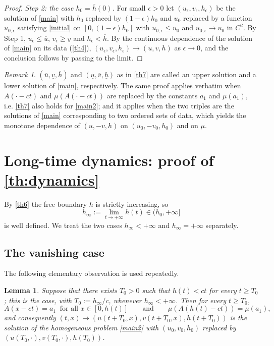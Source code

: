 \documentclass[reqno]{amsart}
\theoremstyle{plain}
\newtheorem{lemma}[theorem]{Lemma}
\theoremstyle{definition}
\theoremstyle{remark}
\newtheorem{remark}{Remark}
\begin{document}
\begin{proof}
	\textit{Step 2: the case $h_0=\overline{h}(0)$.} For small $\epsilon>0$ let
	$(u_\epsilon,v_\epsilon,h_\epsilon)$ be the solution of \eqref{main} with
	$h_0$ replaced by $(1-\epsilon)h_0$ and $u_0$ replaced by a function
	$u_{0,\epsilon}$ satisfying \eqref{initial} on $[0,(1-\epsilon)h_0]$ with
	$u_{0,\epsilon}\le u_0$ and $u_{0,\epsilon}\to u_0$ in $C^2$. By Step 1,
	$u_\epsilon\le\overline{u}$, $v_\epsilon\ge\underline{v}$ and
	$h_\epsilon<\overline{h}$. By the continuous dependence of the solution of
	\eqref{main} on its data (\cref{th4}), $(u_\epsilon,v_\epsilon,h_\epsilon)\to
	(u,v,h)$ as $\epsilon\to0$, and the conclusion follows by passing to the
	limit.
\end{proof}

\begin{remark}\label{rm:sub_super}
	$(\overline{u},\underline{v},\overline{h})$ and
	$(\underline{u},\overline{v},\underline{h})$ as in \cref{th7} are called an
	upper solution and a lower solution of \eqref{main}, respectively. The same
	proof applies verbatim when $A(\cdot-ct)$ and $\mu(A(\cdot-ct))$ are replaced
	by the constants $a_1$ and $\mu(a_1)$, i.e. \cref{th7} also holds for
	\eqref{main2}; and it applies when the two triples are the solutions of
	\eqref{main} corresponding to two ordered sets of data, which yields the
	monotone dependence of $(u,-v,h)$ on $(u_0,-v_0,h_0)$ and on $\mu$.
\end{remark}

\section{Long-time dynamics: proof of \texorpdfstring{\cref{th:dynamics}}{the dynamics theorem}}\label{sec_3}

By \cref{th6} the free boundary $h$ is strictly increasing, so
\[
h_\infty := \lim_{t\to+\infty}h(t)\in(h_0,+\infty]
\]
is well defined. We treat the two cases $h_\infty<+\infty$ and $h_\infty=+\infty$
separately.

\subsection{The vanishing case}

The following elementary observation is used repeatedly.

\begin{lemma}\label{lem:reduction}
	Suppose that there exists $T_0>0$ such that $h(t)<ct$ for every $t\ge T_0$;
	this is the case, with $T_0:=h_\infty/c$, whenever $h_\infty<+\infty$. Then
	for every $t\ge T_0$,
	\[
	A(x-ct)=a_1 \ \text{ for all } x\in[0,h(t)]\qquad\text{and}\qquad
	\mu(A(h(t)-ct))=\mu(a_1),
	\]
	and consequently $(t,x)\mapsto(u(t+T_0,x),v(t+T_0,x),h(t+T_0))$ is the
	solution of the homogeneous problem \eqref{main2} with $(u_0,v_0,h_0)$
	replaced by $(u(T_0,\cdot),v(T_0,\cdot),h(T_0))$.
\end{lemma}
\end{document}
